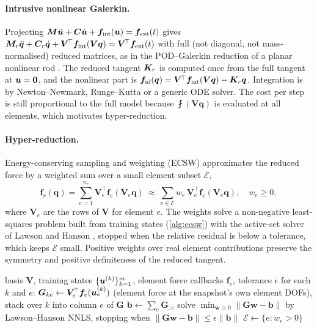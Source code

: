\paragraph{Intrusive nonlinear Galerkin.}
Projecting $\bm{M}\ddot{\bm{u}}+\bm{C}\dot{\bm{u}}+\bm{f}_{\mathrm{int}}(\bm{u})=\bm{f}_{\mathrm{ext}}(t)$ gives
$\bm{M}_r\ddot{\bm q}+\bm{C}_r\dot{\bm q}+\bm V^{\!\top}\bm{f}_{\mathrm{int}}(\bm V\bm q)=\bm V^{\!\top}\bm{f}_{\mathrm{ext}}(t)$
with full (not diagonal, not mass-normalised) reduced matrices, as in the POD--Galerkin reduction of a planar nonlinear rod \cite{georgiou2005}. The reduced tangent $\bm{K}_r$ is computed once from the full tangent at $\bm{u}=\bm 0$,
and the nonlinear part is $\bm f_{\mathrm{nl}}(\bm q)=\bm V^{\!\top}\bm{f}_{\mathrm{int}}(\bm V\bm q)-\bm{K}_r\bm q$. Integration is by Newton--Newmark, Runge--Kutta or a generic ODE solver. The cost per step is still proportional to the full model because $\fint(\bm V\bm q)$ is evaluated at all elements, which motivates hyper-reduction.

\paragraph{Hyper-reduction.}
Energy-conserving sampling and weighting (ECSW) \cite{farhat2015ecsw} approximates the reduced force by a weighted sum over a small element subset $\mathcal E$,
\begin{equation}
  \bm f_r(\bm q)=\sum_{e=1}^{n_e}\bm V_e^{\!\top}\bm f_e(\bm V_e\bm q)\ \approx\ \sum_{e\in\mathcal E}w_e\,\bm V_e^{\!\top}\bm f_e(\bm V_e\bm q),\quad w_e\ge0 ,
  \label{eq:ecsw}
\end{equation}
where $\bm V_e$ are the rows of $\bm V$ for element $e$. The weights solve a non-negative least-squares problem built from training states (\cref{alg:ecsw}) with the active-set solver of Lawson and Hanson \cite{lawson1995lsq}, stopped when the relative residual is below a tolerance, which keeps $\mathcal E$ small.
Positive weights over real element contributions preserve the symmetry and positive definiteness of the reduced tangent.

\begin{algorithm}[t]
\caption{ECSW weight training}\label{alg:ecsw}
\begin{algorithmic}[1]
\Require basis $\bm V$, training states $\{\bm{u}^{(k)}\}_{k=1}^{m}$, element force callbacks $\bm f_e$, tolerance $\epsilon$
\State for each $k$ and $e$: $\bm G_{ke}\gets\bm V_e^{\!\top}\bm f_e(\bm{u}^{(k)}_e)$ (element force at the snapshot's own element DOFs), stack over $k$ into column $e$ of $\bm G$
\State $\bm b\gets\sum_e\bm G_{:e}$ 
\State solve $\min_{\bm w\ge0}\|\bm G\bm w-\bm b\|$ by Lawson--Hanson NNLS, stopping when $\|\bm G\bm w-\bm b\|\le\epsilon\|\bm b\|$
\State $\mathcal E\gets\{e:w_e>0\}$
\end{algorithmic}
\end{algorithm}


